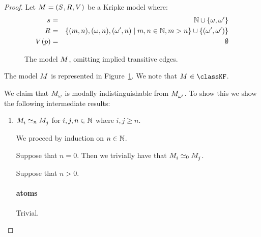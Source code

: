\begin{proof}
Let $\kModelAndTuple$ be a Kripke model where:
\begin{eqnarray*}
\kStateS &=& \naturals \cup \{\omega, \omega'\}\\
\kAccessibility{} &=& \{(m, n), (\omega, n), (\omega', n) \mid m, n \in \naturals, m > n\} \cup \{(\omega', \omega')\}\\
\kValuation(\atomP) &=& \emptyset
\end{eqnarray*}

\begin{figure}
    \centering
    \caption{The model $\kModel$, omitting implied transitive edges.}\label{model-naturals}
\end{figure}

The model $\kModel$ is represented in Figure~\ref{model-naturals}.
We note that $\kModel \in \classKF$.

We claim that $\kPModel{\omega}$ is modally indistinguishable from $\kPModel{\omega'}$.
To show this we show the following intermediate results:
\begin{enumerate}
    \item $\kPModel{i} \bisimilar[n] \kPModel{j}$ for $i, j, n \in \mathbb{N}$ where $i, j \geq n$.

        We proceed by induction on $n \in \mathbb{N}$.

        Suppose that $n = 0$. Then we trivially have that $\kPModel{i} \bisimilar[0] \kPModel{j}$.

        Suppose that $n > 0$.

        \paragraph{atoms} Trivial.


\end{enumerate}
\end{proof}
